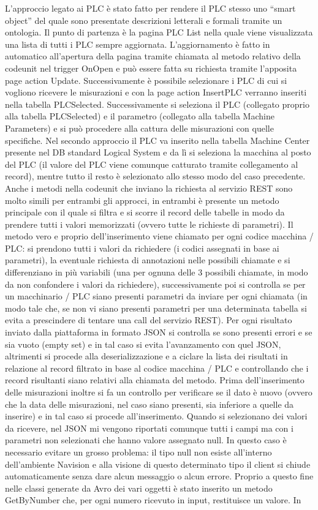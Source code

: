 L’approccio legato ai PLC è stato fatto per rendere il PLC stesso uno “smart object” del quale sono presentate descrizioni letterali e formali tramite un ontologia. Il punto di partenza è la pagina PLC List nella quale viene visualizzata una lista di tutti i PLC sempre aggiornata. L’aggiornamento è fatto in automatico all’apertura della pagina tramite chiamata al metodo relativo della codeunit nel trigger OnOpen e può essere fatta su richiesta tramite l’apposita page action Update. Successivamente è possibile selezionare i PLC di cui si vogliono ricevere le misurazioni e con la page action InsertPLC verranno inseriti nella tabella PLCSelected. Successivamente si seleziona il PLC (collegato proprio alla tabella PLCSelected) e il parametro (collegato alla tabella Machine Parameters) e si può procedere alla cattura delle misurazioni con quelle specifiche. Nel secondo approccio il PLC va inserito nella tabella Machine Center presente nel DB standard Logical System e da lì si seleziona la macchina al posto del PLC (il valore del PLC viene comunque catturato tramite collegamento al record), mentre tutto il resto è selezionato allo stesso modo del caso precedente. Anche i metodi nella codeunit che inviano la richiesta al servizio REST sono molto simili per entrambi gli approcci, in entrambi è presente un metodo principale con il quale si filtra e si scorre il record delle tabelle in modo da prendere tutti i valori memorizzati (ovvero tutte le richieste di parametri). Il metodo vero e proprio dell’inserimento viene chiamato per ogni codice macchina / PLC: si prendono tutti i valori da richiedere (i codici assegnati in base ai parametri), la eventuale richiesta di annotazioni nelle possibili chiamate e si differenziano in più variabili (una per ognuna delle 3 possibili chiamate, in modo da non confondere i valori da richiedere), successivamente poi si controlla se per un macchinario / PLC siano presenti parametri da inviare per ogni chiamata (in modo tale che, se non vi siano presenti parametri per una determinata tabella si evita a prescindere di tentare una call del servizio REST). Per ogni risultato inviato dalla piattaforma in formato JSON si controlla se sono presenti errori e se sia vuoto (empty set) e in tal caso si evita l’avanzamento con quel JSON, altrimenti si procede alla deserializzazione e a ciclare la lista dei risultati in relazione al record filtrato in base al codice macchina / PLC e controllando che i record risultanti siano relativi alla chiamata del metodo. Prima dell’inserimento delle misurazioni inoltre si fa un controllo per verificare se il dato è nuovo (ovvero che la data delle misurazioni, nel caso siano presenti, sia inferiore a quelle da inserire) e in tal caso si procede all’inserimento. Quando si selezionano dei valori da ricevere, nel JSON mi vengono riportati comunque tutti i campi ma con i parametri non selezionati che hanno valore assegnato null. In questo caso è necessario evitare un grosso problema: il tipo null non esiste all’interno dell’ambiente Navision e alla visione di questo determinato tipo il client si chiude automaticamente senza dare alcun messaggio o alcun errore. Proprio a questo fine nelle classi generate da Avro dei vari oggetti è stato inserito un metodo GetByNumber che, per ogni numero ricevuto in input, restituisce un valore. In 